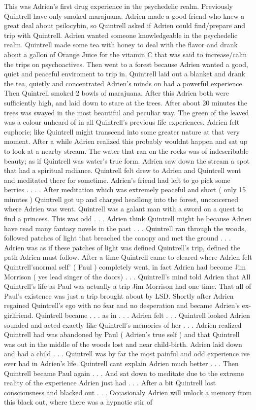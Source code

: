 \documentclass[12pt]{book}
\begin{document}
This was Adrien's first drug experience in the psychedelic realm. Previously Quintrell have only smoked marajuana. Adrien made a good friend who knew a great deal about psilocybin, so Quintrell asked if Adrien could find/prepare and trip with Quintrell. Adrien wanted someone knowledgeable in the psychedelic realm. Quintrell made some tea with honey to deal with the flavor and drank about a gallon of Orange Juice for the vitamin C that was said to increase/calm the trips on psychoactives. Then went to a forest because Adrien wanted a good, quiet and peaceful enviroment to trip in. Quintrell laid out a blanket and drank the tea, quietly and concentrated Adrien's minds on had a powerful experience. Then Quintrell smoked 2 bowls of marajuana. After this Adrien both were sufficiently high, and laid down to stare at the trees. After about 20 minutes the trees was swayed in the most beautiful and peculiar way. The green of the leaved was a colour unheard of in all Quintrell's previous life experiences. Adrien felt euphoric; like Quintrell might transcend into some greater nature at that very moment. After a while Adrien realized this probably wouldnt happen and sat up to look at a nearby stream. The water that ran on the rocks was of indescribable beauty; as if Quintrell was water's true form. Adrien saw down the stream a spot that had a spiritual radiance. Quintrell felt drew to Adrien and Quintrell went and meditated there for sometime. Adrien's friend had left to go pick some berries . . .  . After meditation which was extremely peaceful and short ( only 15 minutes ) Quintrell got up and charged headlong into the forest, unconcerned where Adrien was went. Quintrell was a galant man with a sword on a quest to find a princess. This was odd . . .  Adrien think Quintrell might be because Adrien have read many fantasy novels in the past . . .  Quintrell ran through the woods, followed patches of light that breached the canopy and met the ground . . .  Adrien was as if these patches of light was defined Quintrell's trip, defined the path Adrien must follow. After a time Quintrell came to cleared where Adrien felt Quintrell'snormal self' ( Paul ) completely went, in fact Adrien had become Jim Morrison ( yes lead singer of the doors) . . .  Quintrell's mind told Adrien that All Quintrell's life as Paul was actually a trip Jim Morrison had one time. That all of Paul's existence was just a trip brought about by LSD. Shortly after Adrien regained Quintrell's ego with no fear and no desperation and became Adrien's ex-girlfriend. Quintrell became . . .  as in . . .  Adrien felt . . .  Quintrell looked Adrien sounded and acted exactly like Quintrell's memories of her . . .  Adrien realized Quintrell had was abandoned by Paul ( Adrien's true self ) and that Quintrell was out in the middle of the woods lost and near child-birth. Adrien laid down and had a child . . .  Quintrell was by far the most painful and odd experience ive ever had in Adrien's life. Quintrell cant explain Adrien much better . . .  Then Quintrell became Paul again . . .  And sat down to meditate due to the extreme reality of the experience Adrien just had . . .  After a bit Quintrell lost consciousness and blacked out . . .  Occasionaly Adrien will unlock a memory from this black out, where there was a hypnotic stir of 
\end{document}
